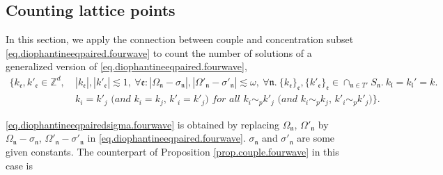 \subsection{Counting lattice points}\label{sec.numbertheory.fourwave} In this section, we apply the connection between couple and concentration subset \eqref{eq.diophantineeqpaired.fourwave} to count the number of solutions of a generalized version of \eqref{eq.diophantineeqpaired.fourwave},
\begin{equation}\label{eq.diophantineeqpairedsigma.fourwave}
\begin{split}
    \{k_{\mathfrak{e}}, k'_{\mathfrak{e}}\in \mathbb{Z}^d,\ &|k_{\mathfrak{e}}|, |k'_{\mathfrak{e}}|\lesssim 1,\ \forall \mathfrak{e}: |\Omega_{\mathfrak{n}}-\sigma_{\mathfrak{n}}|,|\Omega'_{\mathfrak{n}}-\sigma'_{\mathfrak{n}}|\lesssim \omega,\ \forall \mathfrak{n}. \ \{k_{\mathfrak{e}}\}_{\mathfrak{e}}, \{k'_{\mathfrak{e}}\}_{\mathfrak{e}}\in \cap_{\mathfrak{n}\in T'} S_{\mathfrak{n}}.\ k_{\mathfrak{l}}=k_{\mathfrak{l}}'=k. \\
    &\textit{$k_{i}=k'_{j}$ (and $k_{i}=k_{j}$, $k'_{i}=k'_{j}$) for all $k_{i}\sim_{p}k'_{j}$ (and $k_{i}\sim_{p}k_{j}$, $k'_{i}\sim_{p}k'_{j}$)}\}.
\end{split}
\end{equation}

\eqref{eq.diophantineeqpairedsigma.fourwave} is obtained by replacing $\Omega_{\mathfrak{n}}$, $\Omega'_{\mathfrak{n}}$ by $\Omega_{\mathfrak{n}}-\sigma_{\mathfrak{n}}$, $\Omega'_{\mathfrak{n}}-\sigma'_{\mathfrak{n}}$ in \eqref{eq.diophantineeqpaired.fourwave}. $\sigma_{\mathfrak{n}}$ and $\sigma'_{\mathfrak{n}}$ are some given constants. The counterpart of Proposition \ref{prop.couple.fourwave} in this case is

